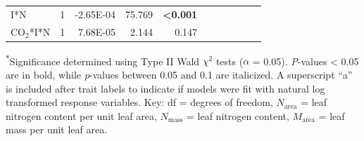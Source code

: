 \begin{landscape}
\begin{table}[]
{\begin{tabular}{p{3cm}p{0.5cm}p{1.75cm}p{1.5cm}p{1.5cm}p{1.75cm}p{1.5cm}p{1.5cm}p{1.75cm}p{1.5cm}p{1.5cm}}
            I*N & \multicolumn{1}{r}{1}
            & \multicolumn{1}{r}{-2.65E-04} & \multicolumn{1}{r}{ 75.769}   & \multicolumn{1}{r}{\textbf{<0.001}}
            & \multicolumn{1}{r}{}          & \multicolumn{1}{r}{}          & \multicolumn{1}{r}{}
            & \multicolumn{1}{r}{}          & \multicolumn{1}{r}{}          & \multicolumn{1}{r}{} 
            \\

            CO$_2$*I*N & \multicolumn{1}{r}{1}
            & \multicolumn{1}{r}{7.68E-05}  & \multicolumn{1}{r}{  2.144}   & \multicolumn{1}{r}{0.147}
            & \multicolumn{1}{r}{}          & \multicolumn{1}{r}{}          & \multicolumn{1}{r}{}
            & \multicolumn{1}{r}{}          & \multicolumn{1}{r}{}          & \multicolumn{1}{r}{} 
            \\
            \hline
    \end{tabular}}
    \label{tab:table5.1}
    \end{table}
\begin{singlespace}
    \noindent \textsuperscript{$*$}Significance determined using Type II Wald $\chi^{2}$ tests ($\alpha$ = 0.05). \textit{P}-values < 0.05 are in bold, while \textit{p}-values between 0.05 and 0.1 are italicized. A superscript “a” is included after trait labels to indicate if models were fit with natural log transformed response variables. Key: df = degrees of freedom, $N_\mathrm{area}$ = leaf nitrogen content per unit leaf area, $N_\mathrm{mass}$ = leaf nitrogen content, $M_\mathrm{area}$ = leaf mass per unit leaf area.
\end{singlespace}
\end{landscape}
\clearpage


